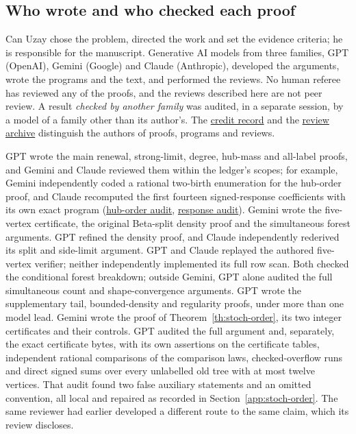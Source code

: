 \documentclass[11pt]{article}
\newcommand{\proofsrc}[2]{\href{https://github.com/uzay-eth/friend-tree-exponent/blob/a0972085ad72ad5685ae7b424988648d1965e73c/#1}{#2}}
\theoremstyle{remark}
\numberwithin{equation}{section}
\begin{document}
\subsection{Who wrote and who checked each proof}
Can Uzay chose the problem, directed the work and set the evidence criteria; he is responsible for the manuscript. Generative AI models from three families, GPT (OpenAI), Gemini (Google) and Claude (Anthropic), developed the arguments, wrote the programs and the text, and performed the reviews. No human referee has reviewed any of the proofs, and the reviews described here are not peer review. A result \emph{checked by another family} was audited, in a separate session, by a model of a family other than its author's. The \proofsrc{round2/who-did-what.md}{credit record} and the \proofsrc{round2/reviews/README.md}{review archive} distinguish the authors of proofs, programs and reviews.

GPT wrote the main renewal, strong-limit, degree, hub-mass and all-label proofs, and Gemini and Claude reviewed them within the ledger's scopes; for example, Gemini independently coded a rational two-birth enumeration for the hub-order proof, and Claude recomputed the first fourteen signed-response coefficients with its own exact program (\proofsrc{round2/reviews/attacks/neon-on-astra-26.md}{hub-order audit}, \proofsrc{round2/reviews/attacks/fable-on-neon2-4.md}{response audit}). Gemini wrote the five-vertex certificate, the original Beta-split density proof and the simultaneous forest arguments. GPT refined the density proof, and Claude independently rederived its split and side-limit argument. GPT and Claude replayed the authored five-vertex verifier; neither independently implemented its full row scan. Both checked the conditional forest breakdown; outside Gemini, GPT alone audited the full simultaneous count and shape-convergence arguments. GPT wrote the supplementary tail, bounded-density and regularity proofs, under more than one model lead. Gemini wrote the proof of Theorem~\ref{th:stoch-order}, its two integer certificates and their controls. GPT audited the full argument and, separately, the exact certificate bytes, with its own assertions on the certificate tables, independent rational comparisons of the comparison laws, checked-overflow runs and direct signed sums over every unlabelled old tree with at most twelve vertices. That audit found two false auxiliary statements and an omitted convention, all local and repaired as recorded in Section~\ref{app:stoch-order}. The same reviewer had earlier developed a different route to the same claim, which its review discloses.
\end{document}
